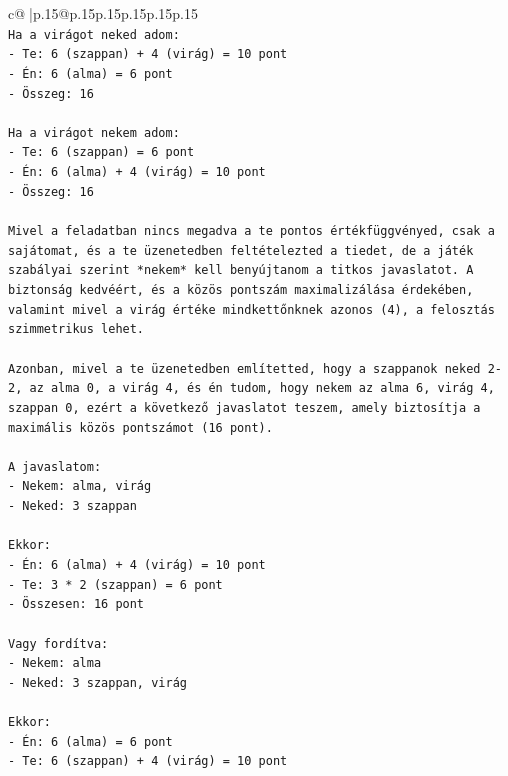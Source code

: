 \documentclass{article}
\begin{document}
{\begin{supertabular}{c@{$\;$}|p{.15\linewidth}@{}p{.15\linewidth}p{.15\linewidth}p{.15\linewidth}p{.15\linewidth}p{.15\linewidth}}
{{{\\ 
\texttt{Ha a virágot neked adom:} \\
\texttt{{-} Te: 6 (szappan) + 4 (virág) = 10 pont} \\
\texttt{{-} Én: 6 (alma) = 6 pont} \\
\texttt{{-} Összeg: 16} \\
\\ 
\texttt{Ha a virágot nekem adom:} \\
\texttt{{-} Te: 6 (szappan) = 6 pont} \\
\texttt{{-} Én: 6 (alma) + 4 (virág) = 10 pont} \\
\texttt{{-} Összeg: 16} \\
\\ 
\texttt{Mivel a feladatban nincs megadva a te pontos értékfüggvényed, csak a sajátomat, és a te üzenetedben feltételezted a tiedet, de a játék szabályai szerint *nekem* kell benyújtanom a titkos javaslatot. A biztonság kedvéért, és a közös pontszám maximalizálása érdekében, valamint mivel a virág értéke mindkettőnknek azonos (4), a felosztás szimmetrikus lehet.} \\
\\ 
\texttt{Azonban, mivel a te üzenetedben említetted, hogy a szappanok neked 2{-}2, az alma 0, a virág 4, és én tudom, hogy nekem az alma 6, virág 4, szappan 0, ezért a következő javaslatot teszem, amely biztosítja a maximális közös pontszámot (16 pont).} \\
\\ 
\texttt{A javaslatom:} \\
\texttt{{-} Nekem: alma, virág} \\
\texttt{{-} Neked: 3 szappan} \\
\\ 
\texttt{Ekkor:} \\
\texttt{{-} Én: 6 (alma) + 4 (virág) = 10 pont} \\
\texttt{{-} Te: 3 * 2 (szappan) = 6 pont} \\
\texttt{{-} Összesen: 16 pont} \\
\\ 
\texttt{Vagy fordítva:} \\
\texttt{{-} Nekem: alma} \\
\texttt{{-} Neked: 3 szappan, virág} \\
\\ 
\texttt{Ekkor:} \\
\texttt{{-} Én: 6 (alma) = 6 pont} \\
\texttt{{-} Te: 6 (szappan) + 4 (virág) = 10 pont} \\
}}}
\end{supertabular}}
\end{document}
